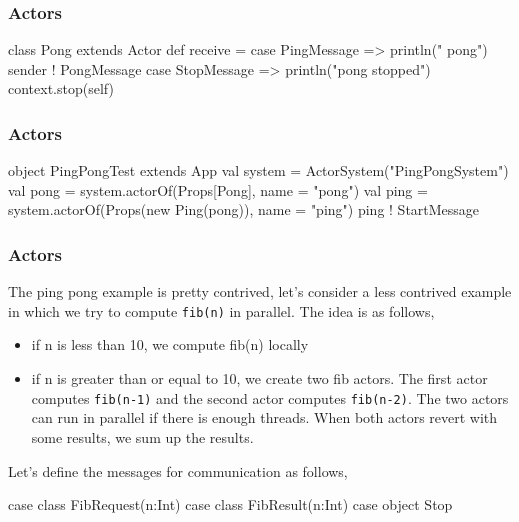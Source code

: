 \documentclass{beamer}
\newcommand{\beb}{\begin{exampleblock}}
\newcommand{\eeb}{\end{exampleblock}}
\begin{document}
\begin{frame}[fragile]
\frametitle{Actors}

\beb{}
\begin{code}
class Pong extends Actor {
  def receive = {
    case PingMessage =>
      println("  pong")
      sender ! PongMessage
    case StopMessage =>
      println("pong stopped")
      context.stop(self)
  }
}
\end{code}
\eeb
\end{frame}
\begin{frame}[fragile]
\frametitle{Actors}

\beb{}
\begin{code}

object PingPongTest extends App {
  val system = ActorSystem("PingPongSystem")
  val pong = system.actorOf(Props[Pong], 
  name = "pong")
  val ping = system.actorOf(Props(new Ping(pong)), 
  name = "ping")
  ping ! StartMessage
}
\end{code}
\eeb
\end{frame}

\begin{frame}[fragile]
\frametitle{Actors}
The ping pong example is pretty contrived, let's consider a less
contrived example in which we try to compute {\tt fib(n)} in
parallel. The idea is as follows,
\begin{itemize}
\item if n is less than 10, we compute fib(n) locally
\item if n is greater than or equal to 10, we create two fib
  actors. The first actor computes {\tt fib(n-1)} and the second actor
  computes {\tt fib(n-2)}. The two actors can run in parallel if there
  is enough threads. When both actors revert with some results, we sum up the results.
\end{itemize}
Let's define the messages for communication as follows,
\beb{}
\begin{code}
  case class FibRequest(n:Int)
  case class FibResult(n:Int)
  case object Stop
\end{code}
\eeb
\end{frame}
\end{document}
